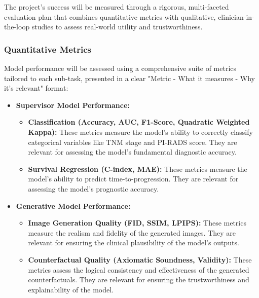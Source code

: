 \documentclass[11pt, a4paper]{article}
\begin{document}
The project's success will be measured through a rigorous, multi-faceted evaluation plan that combines quantitative metrics with qualitative, clinician-in-the-loop studies to assess real-world utility and trustworthiness.

\subsubsection{Quantitative Metrics}
Model performance will be assessed using a comprehensive suite of metrics tailored to each sub-task, presented in a clear "Metric - What it measures - Why it's relevant" format:
\begin{itemize}
    \item \textbf{Supervisor Model Performance:}
        \begin{itemize}
            \item \textbf{Classification (Accuracy, AUC, F1-Score, Quadratic Weighted Kappa):} These metrics measure the model's ability to correctly classify categorical variables like TNM stage and PI-RADS score. They are relevant for assessing the model's fundamental diagnostic accuracy.
            \item \textbf{Survival Regression (C-index, MAE):} These metrics measure the model's ability to predict time-to-progression. They are relevant for assessing the model's prognostic accuracy.
        \end{itemize}
    \item \textbf{Generative Model Performance:}
        \begin{itemize}
            \item \textbf{Image Generation Quality (FID, SSIM, LPIPS):} These metrics measure the realism and fidelity of the generated images. They are relevant for ensuring the clinical plausibility of the model's outputs.
            \item \textbf{Counterfactual Quality (Axiomatic Soundness, Validity):} These metrics assess the logical consistency and effectiveness of the generated counterfactuals. They are relevant for ensuring the trustworthiness and explainability of the model.
        \end{itemize}
\end{itemize}
\end{document}
